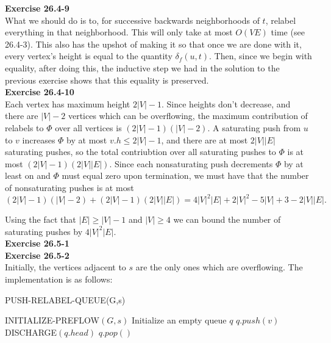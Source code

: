 \documentclass{article}
\begin{document}
\noindent\textbf{Exercise 26.4-9}\\

What we should do is to, for successive backwards neighborhoods of $t$, relabel everything in that neighborhood. This will only take at most $O(VE)$ time (see 26.4-3). This also has the upshot of making it so that once we are done with it, every vertex's height is equal to the quantity $\delta_f(u,t)$. Then, since we begin with equality, after doing this, the inductive step we had in the solution to the previous exercise shows that this equality is preserved.\\

\noindent\textbf{Exercise 26.4-10}\\

Each vertex has maximum height $2|V| - 1$.  Since heights don't decrease, and there are $|V| - 2$ vertices which can be overflowing, the maximum contribution of relabels to $\Phi$ over all vertices is $(2|V| - 1)(|V|-2)$.  A saturating push from $u$ to $v$ increases $\Phi$ by at most $v.h \leq 2|V| - 1$, and there are at most $2|V||E|$ saturating pushes, so the total contriubtion over all saturating pushes to $\Phi$ is at most $(2|V| - 1)(2|V||E|)$.  Since each nonsaturating push decrements $\Phi$ by at least on and $\Phi$ must equal zero upon termination, we must have that the number of nonsaturating pushes is at most
\[ (2|V| - 1)(|V|-2) + (2|V| - 1)(2|V||E|) = 4|V|^2 |E| + 2|V|^2 - 5|V| + 3 - 2|V||E|.\]

Using the fact that $|E| \geq |V| - 1$ and $|V| \geq 4$ we can bound the number of saturating pushes by $4|V|^2|E|$. \\

\noindent\textbf{Exercise 26.5-1}\\

\noindent\textbf{Exercise 26.5-2}\\

Initially, the vertices adjacent to $s$ are the only ones which are overflowing.  The implementation is as follows:

\begin{algorithm}
\caption{PUSH-RELABEL-QUEUE(G,s)}
\begin{algorithmic}[1]
\State INITIALIZE-PREFLOW$(G,s)$
\State Initialize an empty queue $q$
	\State $q.push(v)$
\EndFor
{}
	\State DISCHARGE$(q.head)$
	\State $q.pop()$
\EndWhile
\end{algorithmic}
\end{algorithm}
\end{document}
